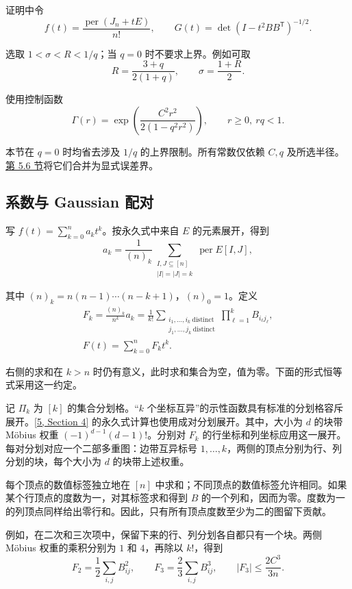 \documentclass[11pt,a4paper]{article}
\newcommand{\paperref}[2]{\hyperref[#1]{#2}}
\begin{document}
证明中令
\[f(t)=\frac{\operatorname{per}(J_n+tE)}{n!},
\qquad G(t)=\det(I-t^2BB^{\mathsf T})^{-1/2}.\]

选取 \(1<\sigma<R<1/q\)；当 \(q=0\) 时不要求上界。例如可取
\[R=\frac{3+q}{2(1+q)},\qquad \sigma=\frac{1+R}{2}.\]

使用控制函数
\[\Gamma(r)=\exp\left(\frac{C^2r^2}{2(1-q^2r^2)}\right),
\qquad r\ge0,\ rq<1.\]

本节在 \(q=0\) 时均省去涉及 \(1/q\) 的上界限制。所有常数仅依赖 \(C,q\) 及所选半径。\paperref{sec-5.6}{第 5.6 节}将它们合并为显式误差界。

\subsection{系数与 Gaussian 配对}\label{sec-5.2}

写 \(f(t)=\sum_{k=0}^n a_kt^k\)。按永久式中来自 \(E\) 的元素展开，得到
\[a_k=\frac1{(n)_k}
\sum_{\substack{I,J\subseteq[n]\\|I|=|J|=k}}
\operatorname{per}E[I,J],\]

其中 \((n)_k=n(n-1)\cdots(n-k+1)\)，\((n)_0=1\)。定义
\[\begin{gathered}
F_k=\frac{(n)_k}{n^k}a_k
=\frac1{k!}
\sum_{\substack{i_1,\ldots,i_k\ \mathrm{distinct}\\
j_1,\ldots,j_k\ \mathrm{distinct}}}
\prod_{\ell=1}^kB_{i_\ell j_\ell},
\\
F(t)=\sum_{k=0}^nF_kt^k.
\end{gathered}\]

右侧的求和在 \(k>n\) 时仍有意义，此时求和集合为空，值为零。下面的形式恒等式采用这一约定。

记 \(\Pi_k\) 为 \([k]\) 的集合分划格。``\(k\) 个坐标互异''的示性函数具有标准的分划格容斥展开。\paperref{bib-5}{[5, Section 4]} 的永久式计算也使用成对分划展开。其中，大小为 \(d\) 的块带 Möbius 权重 \((-1)^{d-1}(d-1)!\)。分别对 \(F_k\) 的行坐标和列坐标应用这一展开。每对分划对应一个二部多重图：边带互异标号 \(1,\ldots,k\)，两侧的顶点分别为行、列分划的块，每个大小为 \(d\) 的块带上述权重。

每个顶点的数值标签独立地在 \([n]\) 中求和；不同顶点的数值标签允许相同。如果某个行顶点的度数为一，对其标签求和得到 \(B\) 的一个列和，因而为零。度数为一的列顶点同样给出零行和。因此，只有所有顶点度数至少为二的图留下贡献。

例如，在二次和三次项中，保留下来的行、列分划各自都只有一个块。两侧 Möbius 权重的乘积分别为 \(1\) 和 \(4\)，再除以 \(k!\)，得到
\[F_2=\frac12\sum_{i,j}B_{ij}^2,
\qquad
F_3=\frac23\sum_{i,j}B_{ij}^3,
\qquad |F_3|\le\frac{2C^3}{3n}.\]
\end{document}
